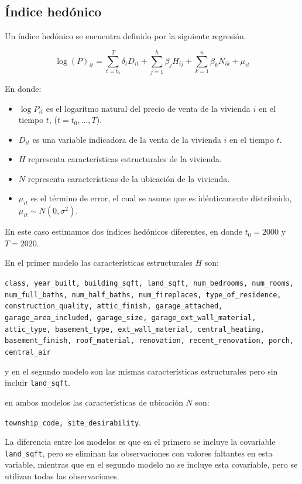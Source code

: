 \documentclass[conference]{IEEEtran}
\begin{document}
\subsection{Índice hedónico}

Un índice hedónico se encuentra definido por la siguiente regresión.

\[ \log(P)_{it} = \sum_{t=t_0}^{T} \delta_t D_{it} + \sum_{j=1}^h \beta_j H_{ij} + \sum_{k=1}^n \beta_k N_{ik} + \mu_{it} \]

En donde:

\begin{itemize}
  \item $\log{P}_{it}$ es el logaritmo natural del precio de venta de la vivienda $i$ en el tiempo $t$, ($t = t_0, \ldots, T$).
  \item $D_{it}$ es una variable indicadora de la venta de la vivienda $i$ en el tiempo $t$.
  \item $H$ representa características estructurales de la vivienda.
  \item $N$ representa características de la ubicación de la vivienda.
  \item $\mu_{it}$ es el término de error, el cual se asume que es idénticamente distribuido, $\mu_{it} \sim N(0, \sigma^2)$.
\end{itemize}

En este caso estimamos dos índices hedónicos diferentes, en donde $t_0 = 2000$ y $T = 2020$. 

En el primer modelo las características estructurales $H$ son:

\texttt{class, year\_built, building\_sqft, land\_sqft, num\_bedrooms, num\_rooms, num\_full\_baths, num\_half\_baths, num\_fireplaces,
type\_of\_residence, construction\_quality, attic\_finish, garage\_attached, garage\_area\_included, garage\_size, garage\_ext\_wall\_material, attic\_type, basement\_type, ext\_wall\_material, central\_heating, basement\_finish, roof\_material, renovation, recent\_renovation, porch, central\_air}

y en el segundo modelo son las mismas características estructurales pero sin incluir \texttt{land\_sqft}.

en ambos modelos las características de ubicación $N$ son:

\texttt{township\_code, site\_desirability}. 

La diferencia entre los modelos es que en el primero se incluye la covariable 
\texttt{land\_sqft}, pero se eliminan las observaciones con valores faltantes en esta variable,
mientras que en el segundo modelo no se incluye esta covariable, pero se utilizan todas las observaciones.
\end{document}
